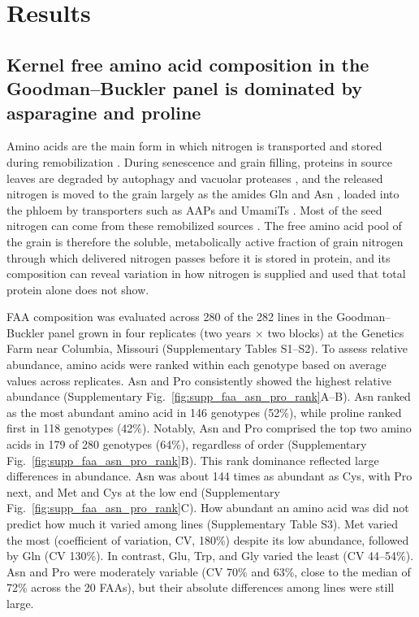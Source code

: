 \section{Results}

\subsection{Kernel free amino acid composition in the Goodman--Buckler panel is dominated by asparagine and proline}

Amino acids are the main form in which nitrogen is transported and stored during remobilization \citep{masclaux2010nitrogen, santiago2020amino}. During senescence and grain filling, proteins in source leaves are degraded by autophagy and vacuolar proteases \citep{potter2026chloroplast}, and the released nitrogen is moved to the grain largely as the amides Gln and Asn \citep{teixeira2026amino}, loaded into the phloem by transporters such as AAPs and UmamiTs \citep{santiago2020amino}. Most of the seed nitrogen can come from these remobilized sources \citep{masclaux2010nitrogen}. The free amino acid pool of the grain is therefore the soluble, metabolically active fraction of grain nitrogen through which delivered nitrogen passes before it is stored in protein, and its composition can reveal variation in how nitrogen is supplied and used that total protein alone does not show.

FAA composition was evaluated across 280 of the 282 lines in the Goodman--Buckler panel grown in four replicates (two years $\times$ two blocks) at the Genetics Farm near Columbia, Missouri (Supplementary Tables S1--S2). To assess relative abundance, amino acids were ranked within each genotype based on average values across replicates. Asn and Pro consistently showed the highest relative abundance (Supplementary Fig.~\ref{fig:supp_faa_asn_pro_rank}A--B). Asn ranked as the most abundant amino acid in 146 genotypes (52\%), while proline ranked first in 118 genotypes (42\%). Notably, Asn and Pro comprised the top two amino acids in 179 of 280 genotypes (64\%), regardless of order (Supplementary Fig.~\ref{fig:supp_faa_asn_pro_rank}B). This rank dominance reflected large differences in abundance. Asn was about 144 times as abundant as Cys, with Pro next, and Met and Cys at the low end (Supplementary Fig.~\ref{fig:supp_faa_asn_pro_rank}C). How abundant an amino acid was did not predict how much it varied among lines (Supplementary Table S3). Met varied the most (coefficient of variation, CV, 180\%) despite its low abundance, followed by Gln (CV 130\%). In contrast, Glu, Trp, and Gly varied the least (CV 44--54\%). Asn and Pro were moderately variable (CV 70\% and 63\%, close to the median of 72\% across the 20 FAAs), but their absolute differences among lines were still large. %

